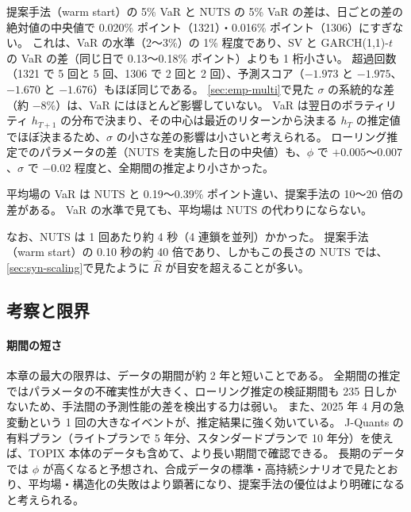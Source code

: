 \begin{table}[tbp]
  \centering
  \caption{NUTS を実施した日（5 日に 1 回、各 47 日）だけでの比較。
    「NUTS との VaR の差」は 5\% VaR の日ごとの差の絶対値の中央値（\% ポイント）。}
  \label{tab:var-nuts-days}
  \small
  \setlength{\tabcolsep}{4pt}
  
\end{table}

提案手法（warm start）の 5\% VaR と NUTS の 5\% VaR の差は、日ごとの差の絶対値の中央値で 0.020\% ポイント（1321）・0.016\% ポイント（1306）にすぎない。
これは、VaR の水準（2〜3\%）の 1\% 程度であり、SV と GARCH(1,1)-$t$ の VaR の差（同じ日で 0.13〜0.18\% ポイント）よりも 1 桁小さい。
超過回数（1321 で 5 回と 5 回、1306 で 2 回と 2 回）、予測スコア（$-1.973$ と $-1.975$、$-1.670$ と $-1.676$）もほぼ同じである。
\cref{sec:emp-multi}で見た $\sigma$ の系統的な差（約 $-8\%$）は、VaR にはほとんど影響していない。
VaR は翌日のボラティリティ $h_{T+1}$ の分布で決まり、その中心は最近のリターンから決まる $h_T$ の推定値でほぼ決まるため、$\sigma$ の小さな差の影響は小さいと考えられる。
ローリング推定でのパラメータの差（NUTS を実施した日の中央値）も、$\phi$ で $+0.005$〜$0.007$、$\sigma$ で $-0.02$ 程度と、全期間の推定より小さかった。

平均場の VaR は NUTS と 0.19〜0.39\% ポイント違い、提案手法の 10〜20 倍の差がある。
VaR の水準で見ても、平均場は NUTS の代わりにならない。

なお、NUTS は 1 回あたり約 4 秒（4 連鎖を並列）かかった。
提案手法（warm start）の 0.10 秒の約 40 倍であり、しかもこの長さの NUTS では、\cref{sec:syn-scaling}で見たように $\hat R$ が目安を超えることが多い。

\subsection{考察と限界}\label{sec:emp-discussion}

\paragraph{期間の短さ}
本章の最大の限界は、データの期間が約 2 年と短いことである。
全期間の推定ではパラメータの不確実性が大きく、ローリング推定の検証期間も 235 日しかないため、手法間の予測性能の差を検出する力は弱い。
また、2025 年 4 月の急変動という 1 回の大きなイベントが、推定結果に強く効いている。
J-Quants の有料プラン（ライトプランで 5 年分、スタンダードプランで 10 年分）を使えば、TOPIX 本体のデータも含めて、より長い期間で確認できる。
長期のデータでは $\phi$ が高くなると予想され、合成データの標準・高持続シナリオで見たとおり、平均場・構造化の失敗はより顕著になり、提案手法の優位はより明確になると考えられる。

